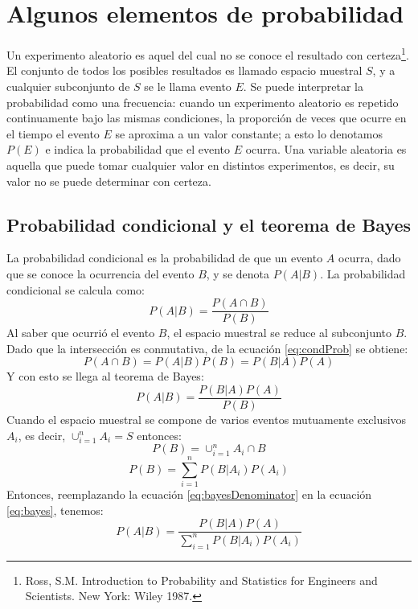 \documentclass[a4paper, 11pt, oneside]{report}
\begin{document}
\section{Algunos elementos de probabilidad}
Un experimento aleatorio es aquel del cual no se conoce el resultado con certeza\footnote{Ross, S.M. Introduction to Probability and Statistics for Engineers and Scientists. New York: Wiley 1987.}. El conjunto de todos los posibles resultados es llamado espacio muestral $S$, y a cualquier subconjunto de $S$ se le llama evento $E$. Se puede interpretar la probabilidad como una frecuencia: cuando un experimento aleatorio es repetido continuamente bajo las mismas condiciones, la proporción de veces que ocurre en el tiempo el evento $E$ se aproxima a un valor constante; a esto lo denotamos $P(E)$ e indica la probabilidad que el evento $E$ ocurra.
Una variable aleatoria es aquella que puede tomar cualquier valor en distintos experimentos, es decir, su valor no se puede determinar con certeza.
\subsection{Probabilidad condicional y el teorema de Bayes}
La probabilidad condicional es la probabilidad de que un evento $A$ ocurra, dado que se conoce la ocurrencia del evento $B$, y se denota $P(A|B)$. La probabilidad condicional se calcula como:
\begin{equation}\label{eq:condProb}
P(A|B) = \frac{P(A \cap B)}{P(B)}
\end{equation}
Al saber que ocurrió el evento $B$, el espacio muestral se reduce al subconjunto $B$. Dado que la intersección es conmutativa, de la ecuación \ref{eq:condProb} se obtiene:
\[P(A \cap B) = P(A|B)P(B) = P(B|A)P(A)\]
Y con esto se llega al teorema de Bayes:
\begin{equation}\label{eq:bayes}
P(A|B) = \frac{P(B|A)P(A)}{P(B)}
\end{equation}
Cuando el espacio muestral se compone de varios eventos mutuamente exclusivos $A_i$, es decir, $\cup_{i=1}^{n} A_i = S$ entonces:
\[P(B)=\cup_{i=1}^{n} {A_i \cap B}\]
\begin{equation}\label{eq:bayesDenominator}
P(B) = \sum_{i=1}^{n}{P(B|A_i)P(A_i)}
\end{equation}
Entonces, reemplazando la ecuación \ref{eq:bayesDenominator} en la ecuación \ref{eq:bayes}, tenemos:
\begin{equation}\label{eq:bayes2}
P(A|B) = \frac{P(B|A)P(A)}{\sum_{i=1}^{n}{P(B|A_i)P(A_i)}}
\end{equation}
\end{document}
